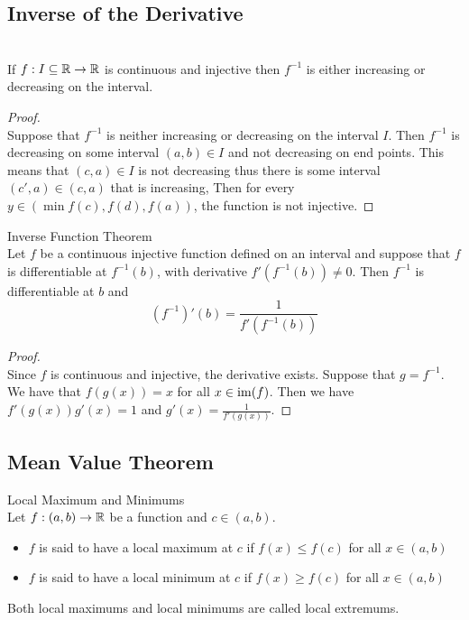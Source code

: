\documentclass[a4paper]{article}
\begin{document}
\subsection{Inverse of the Derivative}
\begin{thm}{}{}\\ If $f:I\subseteq\mathbb{R}\to\mathbb{R}$ is continuous and injective then $f^{-1}$ is either increasing or decreasing on the interval. 
\begin{proof}\\ Suppose that $f^{-1}$ is neither increasing or decreasing on the interval $I$. Then $f^{-1}$ is decreasing on some interval $(a,b)\in I$ and not decreasing on end points. This means that $(c,a)\in I$ is not decreasing thus there is some interval $(c',a)\in(c,a)$ that is increasing, Then for every $y\in(\min{f(c),f(d)},f(a))$, the function is not injective. 
\end{proof}
\end{thm}

\begin{thm}{Inverse Function Theorem}{}\\ Let $f$ be a continuous injective function defined on an interval and suppose that $f$ is differentiable at $f^{-1}(b)$, with derivative $f'\left(f^{-1}(b)\right)\neq0$. Then $f^{-1}$ is differentiable at $b$ and $$\left(f^{-1}\right)'(b)=\frac{1}{f'\left(f^{-1}(b)\right)}$$ 
\begin{proof}\\ Since $f$ is continuous and injective, the derivative exists. Suppose that $g=f^{-1}$. We have that $f(g(x))=x$ for all $x\in\operatorname{im}(f)$. Then we have $f'(g(x))g'(x)=1$ and $g'(x)=\frac{1}{f'(g(x))}$. 
\end{proof}
\end{thm}

\subsection{Mean Value Theorem}
\begin{defn}{Local Maximum and Minimums}{}\\ Let $f:(a,b)\to\mathbb{R}$ be a function and $c\in(a,b)$. 
\begin{itemize}
\item $f$ is said to have a local maximum at $c$ if $f(x)\leq f(c)$ for all $x\in(a,b)$
\item $f$ is said to have a local minimum at $c$ if $f(x)\geq f(c)$ for all $x\in(a,b)$
\end{itemize}
Both local maximums and local minimums are called local extremums. 
\end{defn}
\end{document}

